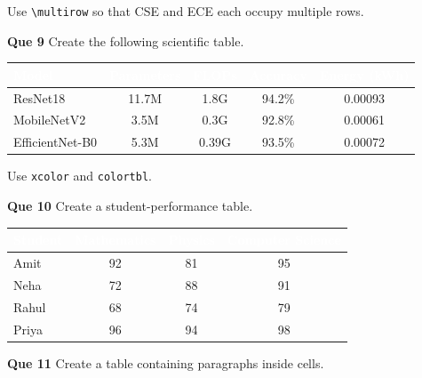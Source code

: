 \documentclass{article}
\begin{document}
\noindent Use \texttt{\textbackslash multirow} so that CSE and ECE each occupy multiple rows.

\vspace{1.5em}

\noindent\textbf{Que 9} Create the following scientific table.

\begin{center}
\begin{tabular}{|l|c|c|c|c|}
\hline
\rowcolor{headerblue}
\textcolor{white}{\textbf{Model}} & 
\textcolor{white}{\textbf{Parameters}} & 
\textcolor{white}{\textbf{FLOPs}} & 
\textcolor{white}{\textbf{Accuracy}} & 
\textcolor{white}{\textbf{Energy (kWh)}} \\
\hline
\rowcolor{lightblue}
ResNet18        & 11.7M & 1.8G  & 94.2\% & 0.00093 \\
\hline
MobileNetV2     & 3.5M  & 0.3G  & 92.8\% & 0.00061 \\
\hline
\rowcolor{lightblue}
EfficientNet-B0 & 5.3M  & 0.39G & 93.5\% & 0.00072 \\
\hline
\end{tabular}
\end{center}

\noindent Use \texttt{xcolor} and \texttt{colortbl}.

\vspace{1.5em}

\noindent\textbf{Que 10} Create a student-performance table.

\begin{center}
\begin{tabular}{|l|c|c|c|}
\hline
\rowcolor{headerblue}
\textcolor{white}{\textbf{Student}} & 
\textcolor{white}{\textbf{Mathematics}} & 
\textcolor{white}{\textbf{Physics}} & 
\textcolor{white}{\textbf{Computer Science}} \\
\hline
Amit  & \cellcolor{cellgreen}92  & \cellcolor{cellyellow}81 & \cellcolor{cellgreen}95  \\
\hline
Neha  & \cellcolor{cellred}72    & \cellcolor{cellyellow}88 & \cellcolor{cellgreen}91  \\
\hline
Rahul & \cellcolor{cellred}68    & \cellcolor{cellred}74    & \cellcolor{cellyellow}79 \\
\hline
Priya & \cellcolor{cellgreen}96  & \cellcolor{cellgreen}94  & \cellcolor{cellgreen}98  \\
\hline
\end{tabular}
\end{center}

\noindent\textbf{Que 11} Create a table containing paragraphs inside cells.
\end{document}
